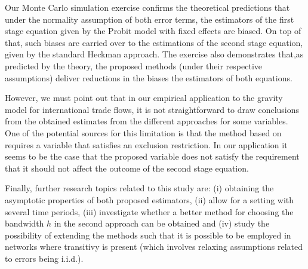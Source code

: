 Our Monte Carlo simulation exercise confirms the theoretical predictions that under the normality assumption of both error terms, the estimators of the first stage equation given by the Probit model with fixed effects are biased. On top of that, such biases are carried over to the estimations of the second stage equation, given by the standard Heckman approach. The exercise also demonstrates that,as predicted by the theory, the proposed methods (under their respective assumptions) deliver reductions in the biases the estimators of both equations.

However, we must point out that in our empirical application to the gravity model for international trade flows, it is not straightforward to draw conclusions from the obtained estimates from the different approaches for some variables. One of the potential sources for this limitation is that the method based on \cite{kyriazidou1997estimation} requires a variable that satisfies an exclusion restriction. In our application it seems to be the case that the proposed variable does not satisfy the requirement that it should not affect the outcome of the second stage equation.

Finally, further research topics related to this study are: (i) obtaining the asymptotic properties of both proposed estimators, (ii) allow for a setting with several time periods, (iii) investigate whether a better method for choosing the bandwidth $h$ in the second approach can be obtained and (iv) study the possibility of extending the methods such that it is possible to be employed in networks where transitivy is present (which involves relaxing assumptions related to errors being i.i.d.).

